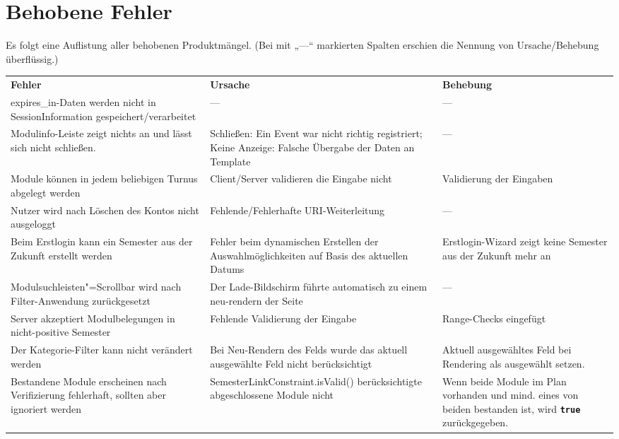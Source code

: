 \FloatBarrier
\section{Behobene Fehler}

Es folgt eine Auflistung aller behobenen Produktmängel. (Bei mit „---“ markierten Spalten erschien die Nennung von Ursache/Behebung überflüssig.)


\begin{longtable}{| >{\hspace{0pt}} p{} | >{\hspace{0pt}} p{} | >{\hspace{0pt}} p{} | }
	\hline
	\textbf{Fehler} & \textbf{Ursache}  & \textbf{Behebung} \\ 
	\hhline{|=|=|=|}
	\endfirsthead
	\endhead
	expires\_in-Daten werden nicht in SessionInformation gespeichert/verarbeitet & --- & --- \\
	\hline
	Modulinfo-Leiste zeigt nichts an und lässt sich nicht schließen. & Schließen: Ein Event war nicht richtig registriert; Keine Anzeige: Falsche Übergabe der Daten an Template & --- \\
	\hline
	Module können in jedem beliebigen Turnus abgelegt werden & Client/Server validieren die Eingabe nicht & Validierung der Eingaben \\
	\hline
	Nutzer wird nach Löschen des Kontos nicht ausgeloggt & Fehlende/Fehlerhafte URI-Weiterleitung & --- \\
	\hline
	Beim Erstlogin kann ein Semester aus der Zukunft erstellt werden & Fehler beim dynamischen Erstellen der Auswahlmöglichkeiten auf Basis des aktuellen Datums & Erstlogin-Wizard zeigt keine Semester aus der Zukunft mehr an \\
	\hline
	Modulsuchleisten"=Scrollbar wird nach Filter-Anwendung zurückgesetzt & Der Lade-Bildschirm führte automatisch zu einem neu-rendern der Seite & --- \\
	\hline
	Server akzeptiert Modulbelegungen in nicht-positive Semester & Fehlende Validierung der Eingabe & Range-Checks eingefügt \\
	\hline
	Der Kategorie-Filter kann nicht verändert werden & Bei Neu-Rendern des Felds wurde das aktuell ausgewählte Feld nicht berücksichtigt & Aktuell ausgewähltes Feld bei Rendering als ausgewählt setzen. \\
	\hline
	Bestandene Module erscheinen nach Verifizierung fehlerhaft, sollten aber ignoriert werden & SemesterLinkConstraint.isValid() berücksichtigte abgeschlossene Module nicht & Wenn beide Module im Plan vorhanden und mind. eines von beiden bestanden ist, wird \texttt{\textbf{true}} zurückgegeben. \\

\end{longtable}
